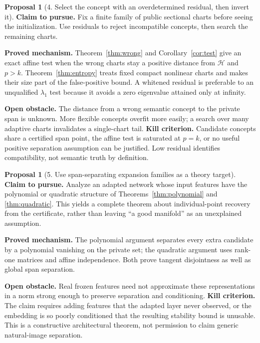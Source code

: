 \documentclass[11pt,a4paper]{article}
\theoremstyle{definition}
\theoremstyle{definition}
\newtheorem{proposal}[theorem]{Proposal}
\theoremstyle{remark}\newtheorem{remark}[theorem]{Remark}
\newcommand{\HH}{\mathcal H}\newcommand{\XX}{\mathcal X}\newcommand{\col}{\operatorname{col}}
\begin{document}
\begin{proposal}[4. Select the concept with an overdetermined residual, then invert it]
\textbf{Claim to pursue.} Fix a finite family of public sectional charts before seeing the initialization. Use residuals to reject incompatible concepts, then search the remaining charts.

\textbf{Proved mechanism.} Theorem~\ref{thm:wrong} and Corollary~\ref{cor:test} give an exact affine test when the wrong charts stay a positive distance from $\HH$ and $p>k$. Theorem~\ref{thm:entropy} treats fixed compact nonlinear charts and makes their size part of the false-positive bound. A whitened residual is preferable to an unqualified $\lambda_1$ test because it avoids a zero eigenvalue attained only at infinity.

\textbf{Open obstacle.} The distance from a wrong semantic concept to the private span is unknown. More flexible concepts overfit more easily; a search over many adaptive charts invalidates a single-chart tail. \textbf{Kill criterion.} Candidate concepts share a certified span point, the affine test is saturated at $p=k$, or no useful positive separation assumption can be justified. Low residual identifies compatibility, not semantic truth by definition.
\end{proposal}

\begin{proposal}[5. Use span-separating expansion families as a theory target]
\textbf{Claim to pursue.} Analyze an adapted network whose input features have the polynomial or quadratic structure of Theorems~\ref{thm:polynomial} and \ref{thm:quadratic}. This yields a complete theorem about individual-point recovery from the certificate, rather than leaving ``a good manifold'' as an unexplained assumption.

\textbf{Proved mechanism.} The polynomial argument separates every extra candidate by a polynomial vanishing on the private set; the quadratic argument uses rank-one matrices and affine independence. Both prove tangent disjointness as well as global span separation.

\textbf{Open obstacle.} Real frozen features need not approximate these representations in a norm strong enough to preserve separation and conditioning. \textbf{Kill criterion.} The claim requires adding features that the adapted layer never observed, or the embedding is so poorly conditioned that the resulting stability bound is unusable. This is a constructive architectural theorem, not permission to claim generic natural-image separation.
\end{proposal}
\end{document}
